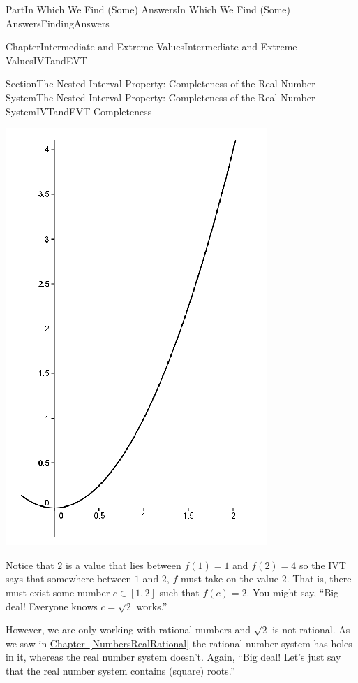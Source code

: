 \documentclass[oneside,10pt,]{book}
\newcommand{\xreffont}{\relax}
\numberwithin{equation}{part}
\begin{document}
\begin{partptx}{Part}{In Which We Find (Some) Answers}{}{In Which We Find (Some) Answers}{}{}{FindingAnswers}
\begin{chapterptx}{Chapter}{Intermediate and Extreme Values}{}{Intermediate and Extreme Values}{}{}{IVTandEVT}
\begin{sectionptx}{Section}{The Nested Interval Property: Completeness of the Real Number System}{}{The Nested Interval Property: Completeness of the Real Number System}{}{}{IVTandEVT-Completeness}
\begin{image}{0.315}{0.37}{0.315}{}%
\includegraphics[width=\linewidth]{external/images/Ch6fig1.png}
\end{image}%
Notice that \(2\) is a value that lies between \(f(1)=1\) and \(f(2)=4\) so the \hyperref[IntermediateValueTheorem]{IVT} says that somewhere between \(1\) and \(2\), \(f\) must take on the value \(2\).  That is, there must exist some number \(c\in[1,2]\) such that \(f(c)=2\).  You might say, ``Big deal!  Everyone knows \(c=\sqrt{2}\) works.''%
\par
However, we are only working with rational numbers and \(\sqrt{2}\) \(\)is not rational.  As we saw in \hyperref[NumbersRealRational]{Chapter~{\xreffont\ref{NumbersRealRational}}} the rational number system has holes in it, whereas the real number system doesn't. Again, ``Big deal!  Let's just say that the real number system contains (square) roots.''%

\end{sectionptx}
\end{chapterptx}
\end{partptx}
\end{document}

